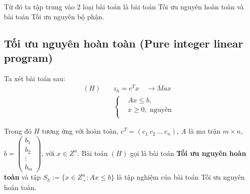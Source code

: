 \documentclass[12pt,a4paper]{report}
\begin{document}
Từ đó ta tập trung vào 2 loại bài toán là bài toán Tối ưu nguyên hoàn toàn và bài toán Tối ưu nguyên bộ phận.
\subsection*{Tối ưu nguyên hoàn toàn (Pure integer linear program)}
    Ta xét bài toán sau:
    \begin{equation} \label{H}
        \begin{split}
        (H) \quad & z_h=c^Tx \quad \longrightarrow Max \\
                  & \left\{\begin{split}
                    &Ax \leq  b, \\
                    &x \geq 0, \text{ nguyên} \\
                    \end{split}\right.    
        \end{split}
        \end{equation}            

    Trong đó $H$ tương ứng với hoàn toàn, $c^T=(c_1 \: c_2 \: \ldots \: c_n)$, $A$ là ma trận $m\times n$, $b=\begin{pmatrix}
        b_1 \\
        b_2 \\
        \vdots \\
        b_m
        \end{pmatrix}$, với $x\in Z^n$. Bài toán $(H)$ gọi là bài toán \textbf{Tối ưu nguyên hoàn toàn} và tập $S_h:=\{x\in Z^n_+: Ax\leq b\}$ là tập nghiệm của bài toán Tối ưu nguyên hoàn toàn.


\end{document}
